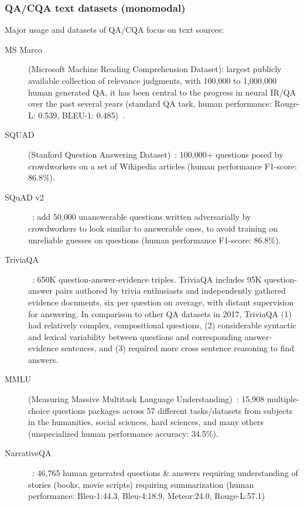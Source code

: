 \documentclass[acmsmall]{acmart}
\begin{document}
\subsubsection{QA/CQA text datasets (monomodal)}
Major usage and datasets of QA/CQA focus on text sources:
\begin{description}
    \item [MS Marco] (Microsoft Machine Reading Comprehension Dataset): largest publicly available collection of relevance judgments, with 100,000 to 1,000,000 human generated QA, it has been central to the progress in neural IR/QA over the past several years (standard QA task, human performance: Rouge-L: 0.539, BLEU-1: 0.485)~\citep{liangetal.HolisticEvaluationLanguage2022, linPretrainedTransformersText2021}. 
    \item [SQUAD] (Stanford  Question  Answering Dataset)~\citep{rajpurkarSQuAD1000002016}: 100,000+ questions posed by crowdworkers on a set of Wikipedia articles (human performance F1-score: 86.8\%).
    \item [SQuAD v2]~\citep{rajpurkarKnowWhatYou2018}: add 50,000 unanswerable questions written adversarially by crowdworkers to look similar to answerable ones, to avoid training on unreliable guesses on questions (human performance F1-score: 86.8\%).
    \item [TriviaQA]~\citep{joshiTriviaQALargeScale2017}: 650K question-answer-evidence triples. TriviaQA includes 95K question-answer pairs authored by trivia enthusiasts and independently gathered evidence documents, six per question on average, with distant supervision for answering. In comparison to other QA datasets in 2017, TriviaQA (1) had relatively complex, compositional questions, (2) considerable syntactic and lexical variability between questions and corresponding answer-evidence sentences, and (3) required more cross sentence reasoning to find answers.
    \item [MMLU] (Measuring Massive Multitask Language Understanding)~\citep{hendrycksMeasuringMassiveMultitask2021}: 15,908 multiple-choice questions packages across 57 different tasks/datasets from subjects in the humanities, social sciences, hard sciences, and many others (unspecialized human performance accuracy: 34.5\%).
    \item [NarrativeQA]~\citep{kociskyNarrativeQAReadingComprehension2017}: 46,765 human generated questions \& answers requiring understanding of stories (books, movie scripts) requiring summarization (human performance: Bleu-1:44.3, Bleu-4:18.9, Meteor:24.0, Rouge-L:57.1)

\end{description}
\end{document}
